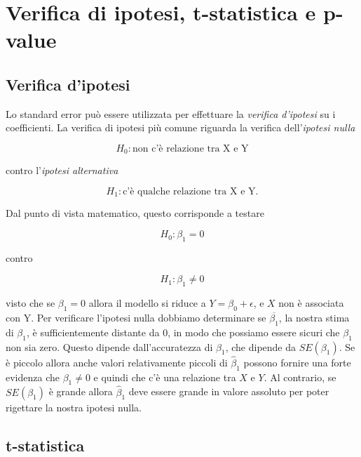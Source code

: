 \section{Verifica di ipotesi, t-statistica e p-value}

\subsection{Verifica d'ipotesi}

Lo standard error può essere utilizzata per effettuare la \textit{verifica d'ipotesi} su i coefficienti. La verifica di ipotesi più comune riguarda la verifica dell'\textit{ipotesi nulla}

\begin{equation}
H_0: \text{non c'è relazione tra X e Y}
\end{equation}

contro l'\textit{ipotesi alternativa}

\begin{equation}
H_1: \text{c'è qualche relazione tra X e Y}.
\end{equation}

Dal punto di vista matematico, questo corrisponde a testare

\begin{equation}
H_0: {\beta}_1 = 0
\end{equation}

contro

\begin{equation}
H_1: {\beta}_1 \neq 0
\end{equation}

visto che se ${\beta}_1 = 0$ allora il modello si riduce a $Y = {\beta}_0 + \epsilon$, e $X$ non è associata con Y. Per verificare l'ipotesi nulla dobbiamo determinare se $\overline{{\beta}_1}$, la nostra stima di ${\beta}_1$, è sufficientemente distante da $0$, in modo che possiamo essere sicuri che ${\beta}_1$ non sia zero. Questo dipende dall'accuratezza di ${\beta}_1$, che dipende da $SE({\beta}_1)$. Se è piccolo allora anche valori relativamente piccoli di ${\hat{\beta}}_1$ possono fornire una forte evidenza che ${\beta}_1 \neq 0$ e quindi che c'è una relazione tra $X$ e $Y$. Al contrario, se $SE({\beta}_1)$ è grande allora ${\hat{\beta}}_1$ deve essere grande in valore assoluto per poter rigettare la nostra ipotesi nulla.

\subsection{t-statistica}

